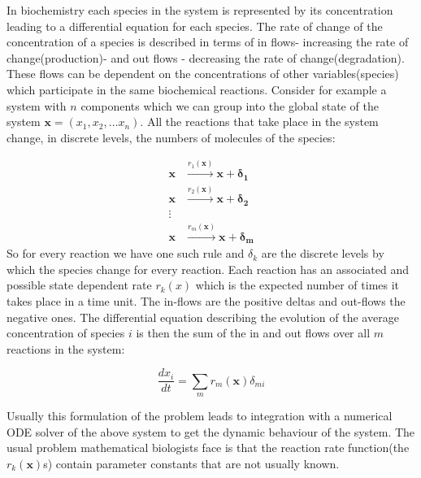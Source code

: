 In biochemistry each species in the system is represented by its 
concentration leading to a differential equation for each species. The
rate of change of the concentration of a species is described in terms
of in flows- increasing the rate of change(production)- and out flows
- decreasing the rate of change(degradation). These flows can be
dependent on the concentrations of other variables(species) which
participate in the same biochemical reactions. Consider for example a
system with $n$ components which we can group into the global state of
the system $\mathbf{x} = (x_1, x_2, \dots x_n)$. All the reactions
that take place in the system change, in discrete levels, the numbers
of molecules of the species:

\begin{align*}
\mathbf{x} &\overset{r_1(\mathbf{x})}{\longrightarrow} \mathbf{x} +
\mathbf{\delta_1}\\
\mathbf{x} &\overset{r_2(\mathbf{x})}{\longrightarrow} \mathbf{x} +
\mathbf{\delta_2}\\
\vdots \\
\mathbf{x} &\overset{r_m(\mathbf{x})}{\longrightarrow} \mathbf{x} +
\mathbf{\delta_m}
\end{align*}
So for every reaction we have one such rule and $\delta_k$ are the
discrete levels by which the species change for every reaction. Each
reaction has an associated and possible state dependent rate $r_k(x)$
which is the expected number of times it takes place in a time
unit. The in-flows are the positive deltas and out-flows the negative
ones. The differential equation describing the evolution of the average concentration
of  species $i$ is then the sum of the in
and out flows over all $m$ reactions in the system:

\begin{equation*}
\frac{dx_i}{dt} = \sum_{m} r_m(\mathbf{x})\delta_{mi}
\end{equation*}

Usually this formulation of the problem leads to integration with a
numerical ODE solver of the above system to get the dynamic behaviour
of the system. The usual problem mathematical biologists face is that
the reaction rate function(the $r_k(\mathbf{x})$s) contain parameter
constants that are not usually known. 

